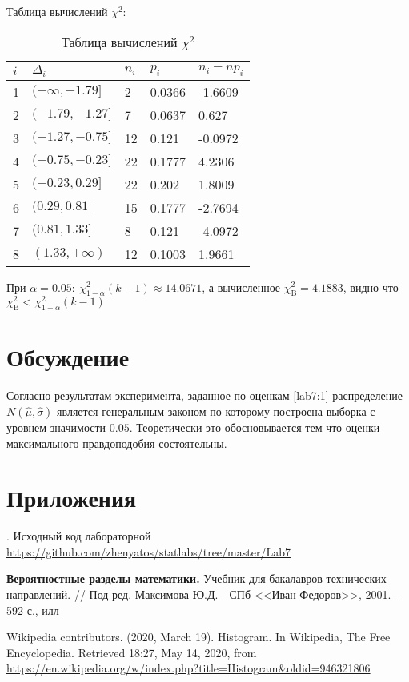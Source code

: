 \documentclass[12pt,a4paper]{article}
\begin{document}
Таблица вычислений $\chi^2$:
\begin{table}[h!]
	\centering
	\begin{tabular}{|l|l|l|l|l|}
		\hline
		$i$&$\Delta_i$		&$n_i$&$p_i$	&$n_i - np_i$  \\ \hline
		1&$(-\infty, -1.79]$&2    &0.0366  	&-1.6609  	\\ \hline
		2&$(-1.79, -1.27]$	&7    &0.0637	&0.627  	\\ \hline
		3&$(-1.27, -0.75]$	&12   &0.121	&-0.0972  	\\ \hline
		4&$(-0.75, -0.23]$	&22   &0.1777	&4.2306  	\\ \hline
		5&$(-0.23, 0.29]$	&22   &0.202	&1.8009    \\ \hline
		6&$(0.29, 0.81]$	&15   &0.1777	&-2.7694	\\ \hline
		7&$(0.81, 1.33]$	&8    &0.121   &-4.0972  	\\ \hline
		8&$(1.33, +\infty)$	&12   &0.1003	&1.9661  	\\ \hline
	\end{tabular}
	\caption{Таблица вычислений $\chi^2$}
\end{table}

При $\alpha = 0.05: \ \chi^2_{1-\alpha}(k-1) \approx 14.0671$, а вычисленное $\chi^2_{\text{B}} = 4.1883$, видно что \\ $\chi^2_{\text{B}} < \chi^2_{1-\alpha}(k-1)$
\pagebreak

\section{Обсуждение}
Согласно результатам эксперимента, заданное по оценкам \eqref{lab7:1} распределение $N(\widehat{\mu}, \widehat{\sigma})$ является генеральным законом по которому построена выборка с уровнем значимости $0.05$. Теоретически это обосновывается тем что оценки максимального правдоподобия состоятельны.
\pagebreak

\section{Приложения}\label{sec:appl}
. Исходный код лабораторной {\url{https://github.com/zhenyatos/statlabs/tree/master/Lab7}}

\begin{thebibliography}{9} 
	 \textbf{Вероятностные разделы математики.} Учебник для бакалавров технических направлений. // Под ред. Максимова Ю.Д. - СПб <<Иван Федоров>>, 2001. - 592 с., илл
	
	 Wikipedia contributors. (2020, March 19). Histogram. In Wikipedia, The Free Encyclopedia. Retrieved 18:27, May 14, 2020, from \url{https://en.wikipedia.org/w/index.php?title=Histogram&oldid=946321806}
\end{thebibliography}
\end{document}

